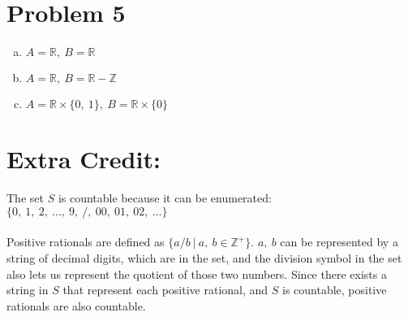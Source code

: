 \documentclass[11pt]{article}
\begin{document}
\section*{Problem 5}
	\begin{enumerate}[(a)]
	\item
		$A = \mathbb{R},\ B = \mathbb{R}$
		
	\item
		$A = \mathbb{R},\ B = \mathbb{R} - \mathbb{Z}$
	
	
	\item
		$A = \mathbb{R} \times \{0,\ 1\},\ B = \mathbb{R} \times \{0\}$
	
	
	\end{enumerate}	




\section*{Extra Credit:}
	The set $S$ is countable because it can be enumerated: $\{0,\ 1,\ 2,\ \ldots,\ 9,\ /,\ 00,\ 01,\ 02,\ \ldots\}$
	\\\\
	Positive rationals are defined as $\{ a/b\ |\ a,\ b \in \mathbb{Z}^+\}$. $a,\ b$ can be represented by a string
	of decimal digits, which are in the set, and the division symbol in the set also lets us represent the quotient of those two
	numbers. Since there exists a string in $S$ that represent each positive rational, and $S$ is countable,
	positive rationals are also countable.
	
	
\end{document}
